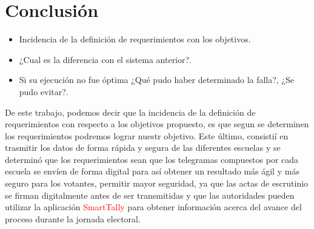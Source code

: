 \documentclass[titlepage,a4paper,twoside]{article}
\theoremstyle{definition}
\numberwithin{algorithm}{section}
\theoremstyle{remark}
\numberwithin{equation}{section}
\begin{document}

    
    
    
    
    

    
    \section{Conclusión}
    

    \begin{itemize}
    	\item Incidencia de la definición de requerimientos con los objetivos.
    	\item ¿Cual es la diferencia con el sistema anterior?.
    	\item Si su ejecución no fue óptima ¿Qué pudo haber determinado la falla?, ¿Se pudo evitar?.
    \end{itemize}
    De este trabajo, podemos decir que la incidencia de la definición de requerimientos con respecto a los objetivos propuesto, es que segun se determinen los requerimientos podremos lograr nuestr objetivo. Este último, consistií en trasmitir los datos de forma rápida y segura de las diferentes escuelas y se determinó que los requerimientos sean que los telegramas compuestos por cada escuela se envíen de forma digital para así obtener un resultado más ágil y más seguro para los votantes, permitir mayor seguridad, ya que las actas de escrutinio se firman digitalmente antes de ser transmitidas y que las autoridades pueden utilizar la aplicación \textcolor{red}{SmartTally} para obtener información acerca del avance del proceso durante la jornada electoral.
    
\end{document}
